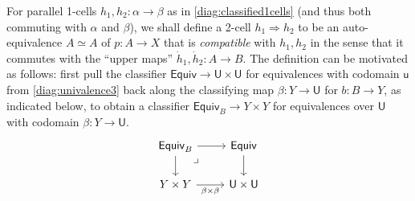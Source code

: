 \documentclass[12pt,reqno]{amsart}
\renewcommand{\to}{\ensuremath{\rightarrow}}
\renewcommand{\t}{\ensuremath{\mathsf{u}}}
\newcommand{\T}{\ensuremath{\mathsf{U}}}
\newcommand{\pbcorner}{\arrow[dr,phantom,"\lrcorner" very near start, shift right=.5ex]} %
\theoremstyle{remark}
\theoremstyle{definition}
\begin{document}
%
%
For parallel 1-cells $h_1, h_2 : \alpha \to \beta$ as in \eqref{diag:classified1cells} (and thus both commuting with $\alpha$ and $\beta$), we shall define a 2-cell $h_1\Rightarrow h_2$ to be an auto-equivalence $A\simeq A$ of $p :A \to X$ that is \emph{compatible} with $h_1, h_2$ in the sense that it commutes with the ``upper maps'' $\dot{h}_1, \dot{h}_2 : A \to B$.  The definition can be motivated as follows: first pull the classifier $\mathsf{Equiv} \to \T\times\T$ for equivalences with codomain $\t$ from \eqref{diag:univalence3} back along the classifying map $\beta : Y\to \T$ for $b:B \to Y$, as indicated below, to obtain a classifier $\mathsf{Equiv}_B \to Y\times Y$ for equivalences over $\T$ with codomain $\beta : Y \to \T$.
\begin{equation}\label{eq:pulledbackclassifier}
\begin{tikzcd}
	\mathsf{Equiv}_B \ar[d] \ar[r]  \pbcorner & \mathsf{Equiv} \ar[d] \\  
	Y\times Y \ar[r,swap,"{\beta \times \beta}"] &  \T \times \T
 \end{tikzcd}
 \end{equation}
 
\end{document}
